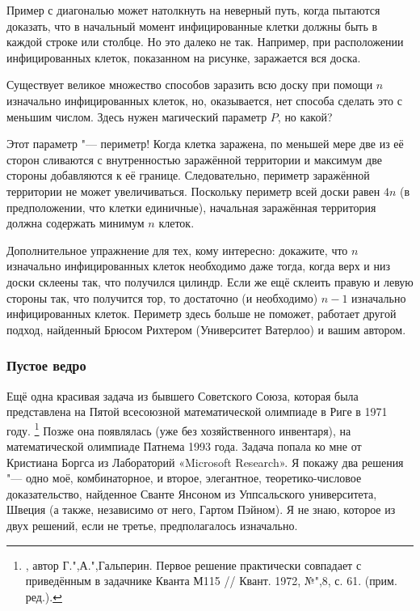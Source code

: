 \documentclass[twoside]{book}
\begin{document}
\medskip

Пример с диагональю может натолкнуть на неверный путь, когда пытаются доказать, что в начальный момент инфицированные клетки должны быть в каждой строке или столбце.
Но это далеко не так.
Например, при расположении инфицированных клеток, показанном на рисунке, заражается вся доска.


Существует великое множество способов заразить всю доску при помощи $n$ изначально инфицированных клеток, но, оказывается, нет способа сделать это с меньшим числом.
Здесь нужен магический параметр $P$, но какой?

Этот параметр "--- периметр!
Когда клетка заражена, по меньшей мере две из её сторон сливаются с внутренностью заражённой территории и максимум две стороны добавляются к её границе.
Следовательно, периметр заражённой территории не может увеличиваться.
Поскольку периметр всей доски равен $4n$ (в предположении, что клетки единичные), начальная заражённая территория должна содержать минимум $n$ клеток.
\heart

Дополнительное упражнение для тех, кому интересно: докажите, что $n$ изначально инфицированных клеток необходимо даже тогда, когда верх и низ доски склеены так, что получился цилиндр.
Если же ещё склеить правую и левую стороны так, что получится тор, то достаточно (и необходимо) $n-1$ изначально инфицированных клеток.
Периметр здесь больше не поможет,
работает другой подход, найденный Брюсом Рихтером (Университет Ватерлоо) %
и вашим автором.

\subsubsection*{Пустое ведро}%

Ещё одна красивая задача из бывшего Советского Союза, которая была представлена на Пятой всесоюзной математической олимпиаде в Риге в 1971 году.%
\footnote{\cite[№148]{ВсМО}, автор Г.",А.",Гальперин.
Первое решение практически совпадает с приведённым в задачнике Кванта М115 /\!/ {Квант}. 1972, №",8, с. 61. (прим. ред.).}
Позже она появлялась (уже без хозяйственного инвентаря), на математической олимпиаде Патнема 1993 года.
Задача попала ко мне от Кристиана Боргса из Лабораторий «Microsoft Research». %
Я покажу два решения "--- одно моё, комбинаторное, и второе, элегантное, теоретико-числовое доказательство, найденное Сванте Янсоном из Уппсальского университета, Швеция %
(а также, независимо от него, Гартом Пэйном). %
Я не знаю, которое из двух решений, если не третье, предполагалось изначально.
\end{document}
